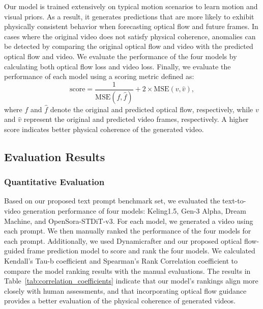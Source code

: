 Our model is trained extensively on typical motion scenarios to learn motion and visual priors. As a result, it generates predictions that are more likely to exhibit physically consistent behavior when forecasting optical flow and future frames. In cases where the original video does not satisfy physical coherence, anomalies can be detected by comparing the original optical flow and video with the predicted optical flow and video. We evaluate the performance of the four models by calculating both optical flow loss and video loss. Finally, we evaluate the performance of each model using a scoring metric defined as:
\begin{equation} 
\text{score} = \frac{1}{\text{MSE}(f, \hat{f})} + 2 \times \text{MSE}(v, \hat{v}), 
\end{equation}
where \( f \) and \( \hat{f} \) denote the original and predicted optical flow, respectively, while \( v \) and \( \hat{v} \) represent the original and predicted video frames, respectively. A higher score indicates better physical coherence of the generated video.



\subsection{Evaluation Results}

\subsubsection{Quantitative Evaluation}

Based on our proposed text prompt benchmark set, we evaluated the text-to-video generation performance of four models: Keling1.5, Gen-3 Alpha, Dream Machine, and OpenSora-STDiT-v3. For each model, we generated a video using each prompt. We then manually ranked the performance of the four models for each prompt. Additionally, we used Dynamicrafter and our proposed optical flow-guided frame prediction model to score and rank the four models. We calculated Kendall's Tau-b coefficient and Spearman's Rank Correlation coefficient to compare the model ranking results with the manual evaluations. The results in Table~\ref{tab:correlation_coefficients} indicate that our model's rankings align more closely with human assessments, and that incorporating optical flow guidance provides a better evaluation of the physical coherence of generated videos.

